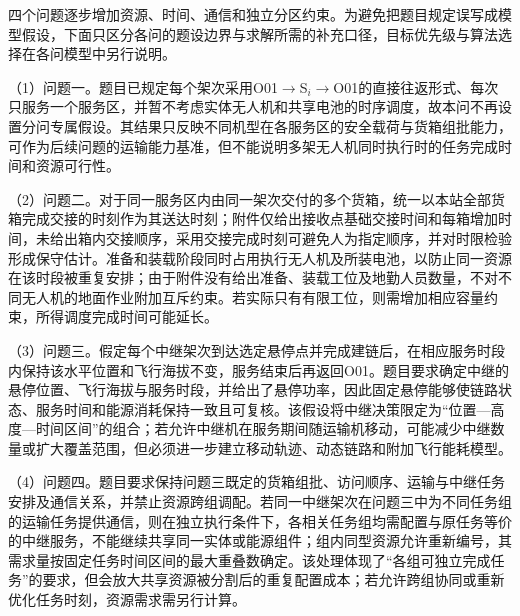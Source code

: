 四个问题逐步增加资源、时间、通信和独立分区约束。为避免把题目规定误写成模型假设，下面只区分各问的题设边界与求解所需的补充口径，目标优先级与算法选择在各问模型中另行说明。

（1）问题一。题目已规定每个架次采用O01$\to$S$_i$$\to$O01的直接往返形式、每次只服务一个服务区，并暂不考虑实体无人机和共享电池的时序调度，故本问不再设置分问专属假设。其结果只反映不同机型在各服务区的安全载荷与货箱组批能力，可作为后续问题的运输能力基准，但不能说明多架无人机同时执行时的任务完成时间和资源可行性。

（2）问题二。对于同一服务区内由同一架次交付的多个货箱，统一以本站全部货箱完成交接的时刻作为其送达时刻；附件仅给出接收点基础交接时间和每箱增加时间，未给出箱内交接顺序，采用交接完成时刻可避免人为指定顺序，并对时限检验形成保守估计。准备和装载阶段同时占用执行无人机及所装电池，以防止同一资源在该时段被重复安排；由于附件没有给出准备、装载工位及地勤人员数量，不对不同无人机的地面作业附加互斥约束。若实际只有有限工位，则需增加相应容量约束，所得调度完成时间可能延长。

（3）问题三。假定每个中继架次到达选定悬停点并完成建链后，在相应服务时段内保持该水平位置和飞行海拔不变，服务结束后再返回O01。题目要求确定中继的悬停位置、飞行海拔与服务时段，并给出了悬停功率，因此固定悬停能够使链路状态、服务时间和能源消耗保持一致且可复核。该假设将中继决策限定为“位置—高度—时间区间”的组合；若允许中继机在服务期间随运输机移动，可能减少中继数量或扩大覆盖范围，但必须进一步建立移动轨迹、动态链路和附加飞行能耗模型。

（4）问题四。题目要求保持问题三既定的货箱组批、访问顺序、运输与中继任务安排及通信关系，并禁止资源跨组调配。若同一中继架次在问题三中为不同任务组的运输任务提供通信，则在独立执行条件下，各相关任务组均需配置与原任务等价的中继服务，不能继续共享同一实体或能源组件；组内同型资源允许重新编号，其需求量按固定任务时间区间的最大重叠数确定。该处理体现了“各组可独立完成任务”的要求，但会放大共享资源被分割后的重复配置成本；若允许跨组协同或重新优化任务时刻，资源需求需另行计算。
